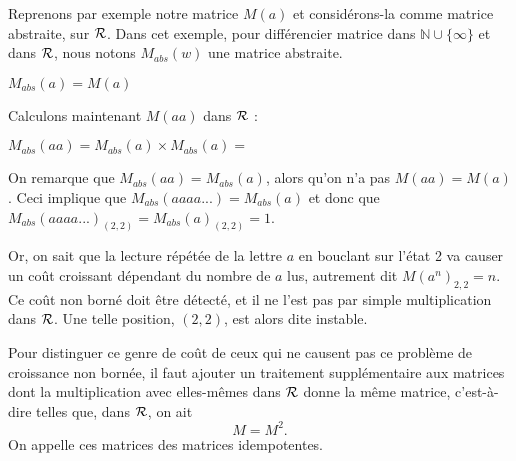 \documentclass[12pt]{memoir}
\begin{document}
Reprenons par exemple notre matrice $M(a)$ et considérons-la comme matrice
abstraite, sur $\mathcal{R}$. Dans cet exemple, pour différencier matrice dans
$\mathbb{N}\cup \{\infty\}$ et dans $\mathcal{R}$, nous notons $M_{abs}(w)$  une matrice abstraite.
\begin{center}
$M_{abs}(a)=M(a)$
\end{center}

Calculons maintenant $M(aa)$ dans $\mathcal{R}$ :

\begin{center}
$M_{abs}(aa) = M_{abs}(a) \times M_{abs}(a) =$
\end{center}

On remarque que $M_{abs}(aa) = M_{abs}(a)$, alors qu'on n'a pas $M(aa) = M(a)$.
Ceci implique que $M_{abs}(aaaa...) = M_{abs}(a)$ et donc que
$M_{abs}(aaaa...)_{(2,2)} = M_{abs}(a)_{(2,2)}=1$.

Or, on sait que la lecture répétée de la lettre $a$ en bouclant sur l'état 2
va causer un coût croissant dépendant du nombre de $a$ lus, autrement dit
$M(a^n)_{2,2}=n$. Ce coût non borné doit être détecté, et il ne l'est pas par
simple multiplication dans $\mathcal{R}$. Une telle position, $(2,2)$, est alors dite instable.

Pour distinguer ce genre de coût de ceux qui ne causent pas ce problème de
croissance non bornée, il faut ajouter un traitement supplémentaire aux
matrices dont la multiplication avec elles-mêmes dans $\mathcal{R}$ donne la même
matrice, c'est-à-dire telles que, dans $\mathcal{R}$, on ait
$$M=M^2.$$ On appelle ces matrices des matrices idempotentes.
\end{document}
